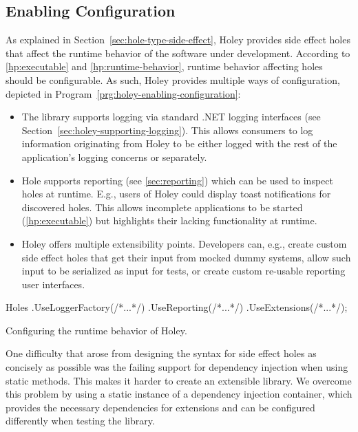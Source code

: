 \subsection{Enabling Configuration}
\label{sec:holey-enabling-configuration}
As explained in Section~\ref{sec:hole-type-side-effect}, Holey provides side effect holes that affect the runtime behavior of the software under development.
According to \ref{hp:executable} and \ref{hp:runtime-behavior}, runtime behavior affecting holes should be configurable.
As such, Holey provides multiple ways of configuration, depicted in Program~\ref{prg:holey-enabling-configuration}:
\begin{itemize}
    \item The library supports logging via standard .NET logging interfaces (see Section~\ref{sec:holey-supporting-logging}). This allows consumers to log information originating from Holey to be either logged with the rest of the application's logging concerns or separately.
    \item Hole supports reporting (see \ref{sec:reporting}) which can be used to inspect holes at runtime. E.g., users of Holey could display toast notifications for discovered holes. This allows incomplete applications to be started (\ref{hp:executable}) but highlights their lacking functionality at runtime.
    \item Holey offers multiple extensibility points. Developers can, e.g., create custom side effect holes that get their input from mocked dummy systems, allow such input to be serialized as input for tests, or create custom re-usable reporting user interfaces.
\end{itemize}

\begin{program}[ht]
\begin{CsCode}
Holes
	.UseLoggerFactory(/*...*/)
	.UseReporting(/*...*/)
	.UseExtensions(/*...*/);
\end{CsCode}
\caption{Configuring the runtime behavior of Holey.}
\label{prg:holey-enabling-configuration}
\end{program}

One difficulty that arose from designing the syntax for side effect holes as concisely as possible was the failing support for dependency injection when using static methods.
This makes it harder to create an extensible library.
We overcome this problem by using a static instance of a dependency injection container, which provides the necessary dependencies for extensions and can be configured differently when testing the library.

